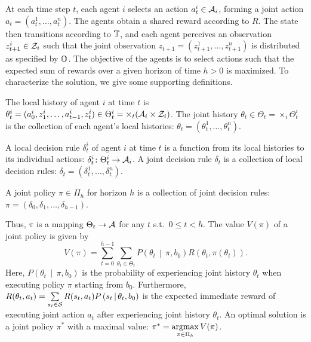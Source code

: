 At each time step $t$, each agent $i$ selects an action $a_t^i \in \mathcal{A}_i$, forming a joint action $a_t = (a_t^1, \ldots, a_t^n)$.
The agents obtain a shared reward according to $R$.
The state then transitions according to $\mathbb{T}$, and each agent perceives an observation $z_{t+1}^i \in \mathcal{Z}_i$ such that the joint observation $z_{t+1} = (z_{t+1}^1, \ldots, z_{t+1}^n)$ is distributed as specified by $\mathbb{O}$.
The objective of the agents is to select actions such that the expected sum of rewards over a given horizon of time $h>0$ is maximized.
To characterize the solution, we give some supporting definitions.
\begin{definition}
The local history of agent $i$ at time $t$ is $\theta^i_t = (a_0^i, z_1^i, \ldots, a_{t-1}^i, z_t^i  ) \in \Theta_t^i = \times_{t}(\mathcal{A}_i\times\mathcal{Z}_i)$. The joint history $\theta_t\in \Theta_t = \times_i \Theta_t^i$ is the collection of each agent's local histories: $\theta_t = (\theta_t^1, \ldots, \theta_t^n )$.
\end{definition}
\begin{definition}
A local decision rule $\delta_t^i$ of agent $i$ at time $t$ is a function from its local histories to its individual actions: $\delta_t^i\colon \Theta_t^i \to \mathcal{A}_i$.
A joint decision rule $\delta_t$ is a collection of local decision rules: $\delta_t = (\delta_t^1, \ldots, \delta_t^n)$.
\end{definition}
\begin{definition}
A joint policy $\pi \in \Pi_h$ for horizon $h$ is a collection of joint decision rules: $\pi = (\delta_0, \delta_1, \ldots, \delta_{h-1})$.
\end{definition}
Thus, $\pi$ is a mapping $\Theta_t \to \mathcal{A}$ for any $t$ s.t.\ $0 \leq t < h$.
The value $V(\pi)$ of a joint policy is given by
\begin{equation}
\label{eq:decpolicy_value}
V(\pi) = \sum\limits_{t=0}^{h-1}\sum\limits_{\theta_t \in \Theta_t} P\left(\theta_t \,\middle|\, \pi, b_0 \right) R(\theta_t, \pi(\theta_t)).
\end{equation}
Here, $P\left(\theta_t \,\middle|\, \pi, b_0 \right)$ is the probability of experiencing joint history $\theta_t$ when executing policy $\pi$ starting from $b_0$.
Furthermore, $R(\theta_t, a_t) = \sum\limits_{s_t\in \mathcal{S}} R(s_t, a_t)P\left(s_t \,\middle|\, \theta_t, b_0\right)$ is the expected immediate reward of executing joint action $a_t$ after experiencing joint history $\theta_t$.
An optimal solution is a joint policy $\pi^*$ with a maximal value: $\pi^* = \operatorname*{argmax}\limits_{\pi \in \Pi_h} V(\pi)$.

